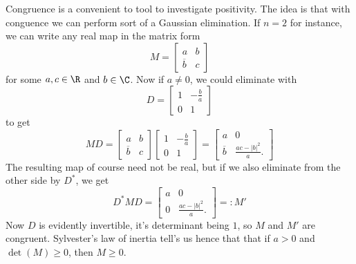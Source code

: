 Congruence is a convenient to tool to investigate positivity. The idea is that with conguence we can perform sort of a Gaussian elimination. If $n = 2$ for instance, we can write any real map in the matrix form
\[
	M =
	\begin{bmatrix}
		a & b \\
		\overline{b} & c
	\end{bmatrix}
\]
for some $a, c \in \R$ and $b \in \C$. Now if $a \neq 0$, we could eliminate with
\[
	D =
	\begin{bmatrix}
		1 & -\frac{b}{a} \\
		0 & 1
	\end{bmatrix}
\]
to get
\[
	M D =
	\begin{bmatrix}
		a & b \\
		\overline{b} & c
	\end{bmatrix}
	\begin{bmatrix}
		1 & -\frac{b}{a} \\
		0 & 1
	\end{bmatrix}
	=
	\begin{bmatrix}
		a & 0 \\
		\overline{b} & \frac{a c - |b|^2}{a}.
	\end{bmatrix}
\]
The resulting map of course need not be real, but if we also eliminate from the other side by $D^{*}$, we get
\[
	D^{*} M D =
	\begin{bmatrix}
		a & 0 \\
		0 & \frac{a c - |b|^2}{a}.
	\end{bmatrix}
	=: M'
\]
Now $D$ is evidently invertible, it's determinant being $1$, so $M$ and $M'$ are congruent. Sylvester's law of inertia tell's us hence that that if $a > 0$ and $\det(M) \geq 0$, then $M \geq 0$.

